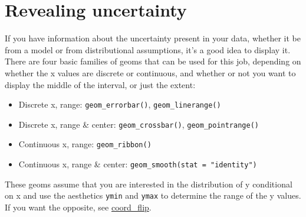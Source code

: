 \hypertarget{sec:uncertainty}{%
\section{Revealing uncertainty}\label{sec:uncertainty}}

If you have information about the uncertainty present in your data,
whether it be from a model or from distributional assumptions, it's a
good idea to display it. There are four basic families of geoms that can
be used for this job, depending on whether the x values are discrete or
continuous, and whether or not you want to display the middle of the
interval, or just the extent:

\begin{itemize}
\tightlist
\item
  Discrete x, range: \texttt{geom\_errorbar()},
  \texttt{geom\_linerange()}
\item
  Discrete x, range \& center: \texttt{geom\_crossbar()},
  \texttt{geom\_pointrange()}
\item
  Continuous x, range: \texttt{geom\_ribbon()}
\item
  Continuous x, range \& center:
  \texttt{geom\_smooth(stat\ =\ "identity")}
\end{itemize}

These geoms assume that you are interested in the distribution of y
conditional on x and use the aesthetics \texttt{ymin} and \texttt{ymax}
to determine the range of the y values. If you want the opposite, see
\protect\hyperlink{sub:coord-flip}{coord\_flip}. 
  
 

\begin{Shaded}
\begin{Highlighting}[]
\StringTok{ }\NormalTok{(}\NormalTok{, }\NormalTok{, }\NormalTok{)}
\StringTok{ }\NormalTok{(} \OperatorTok{:}\NormalTok{, } \NormalTok{(}\NormalTok{, }\NormalTok{, }\NormalTok{))}

\StringTok{ }\OperatorTok{-}\StringTok{ }\OperatorTok{+}\StringTok{ }
\OperatorTok{+}\StringTok{ }\NormalTok{()}
\OperatorTok{+}\StringTok{ }\NormalTok{()}
\OperatorTok{+}\StringTok{ }\NormalTok{(} \NormalTok{)}
\end{Highlighting}
\end{Shaded}

